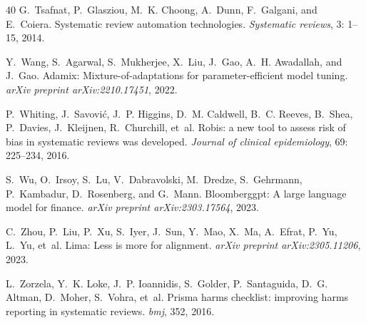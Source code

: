 \documentclass{article}
\begin{document}
\begin{thebibliography}{40}
G.~Tsafnat, P.~Glasziou, M.~K. Choong, A.~Dunn, F.~Galgani, and E.~Coiera.
\newblock Systematic review automation technologies.
\newblock \emph{Systematic reviews}, 3: 1--15, 2014.

Y.~Wang, S.~Agarwal, S.~Mukherjee, X.~Liu, J.~Gao, A.~H. Awadallah, and J.~Gao.
\newblock Adamix: Mixture-of-adaptations for parameter-efficient model tuning.
\newblock \emph{arXiv preprint arXiv:2210.17451}, 2022.

P.~Whiting, J.~Savovi{\'c}, J.~P. Higgins, D.~M. Caldwell, B.~C. Reeves,
  B.~Shea, P.~Davies, J.~Kleijnen, R.~Churchill, et~al.
\newblock Robis: a new tool to assess risk of bias in systematic reviews was
  developed.
\newblock \emph{Journal of clinical epidemiology}, 69: 225--234, 2016.

S.~Wu, O.~Irsoy, S.~Lu, V.~Dabravolski, M.~Dredze, S.~Gehrmann, P.~Kambadur,
  D.~Rosenberg, and G.~Mann.
\newblock Bloomberggpt: A large language model for finance.
\newblock \emph{arXiv preprint arXiv:2303.17564}, 2023.

C.~Zhou, P.~Liu, P.~Xu, S.~Iyer, J.~Sun, Y.~Mao, X.~Ma, A.~Efrat, P.~Yu, L.~Yu,
  et~al.
\newblock Lima: Less is more for alignment.
\newblock \emph{arXiv preprint arXiv:2305.11206}, 2023.

L.~Zorzela, Y.~K. Loke, J.~P. Ioannidis, S.~Golder, P.~Santaguida, D.~G.
  Altman, D.~Moher, S.~Vohra, et~al.
\newblock Prisma harms checklist: improving harms reporting in systematic
  reviews.
\newblock \emph{bmj}, 352, 2016.

\end{thebibliography}


\appendix
\end{document}
